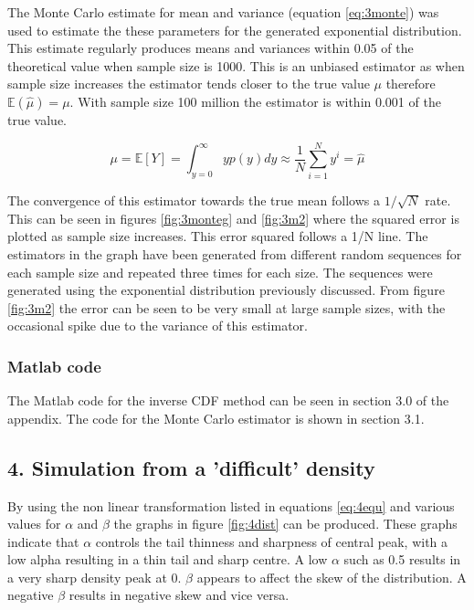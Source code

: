 \documentclass[twoside,twocolumn]{article}
\begin{document}
The Monte Carlo estimate for mean and variance (equation \ref{eq:3monte}) was used to estimate the these parameters for the generated exponential distribution. This estimate regularly produces means and variances within 0.05 of the theoretical value when sample size is 1000. This is an unbiased estimator as when sample size increases the estimator tends closer to the true value $\mu$ therefore $\mathbb{E}(\hat{\mu})=\mu$. With sample size 100 million the estimator is within 0.001 of the true value.

\begin{equation}
\label{eq:3monte}
\mu = \mathbb{E}[Y]=\int^{\infty}_{y=0}yp(y)dy \approx \frac{1}{N}\sum\limits^N_{i=1}y^i = \hat{\mu}
\end{equation} 

The convergence of this estimator towards the true mean follows a $1/\sqrt{N}$ rate. This can be seen in figures \ref{fig:3monteg} and \ref{fig:3m2} where the squared error is plotted as sample size increases. This error squared follows a 1/N line. The estimators in the graph have been generated from different random sequences for each sample size and repeated three times for each size. The sequences were generated using the exponential distribution previously discussed. From figure \ref{fig:3m2} the error can be seen to be very small at large sample sizes, with the occasional spike due to the variance of this estimator.

\subsubsection{Matlab code} %
The Matlab code for the inverse CDF method can be seen in section 3.0 of the appendix. The code for the Monte Carlo estimator is shown in section 3.1.

\subsection{4. Simulation from a 'difficult' density}




By using the non linear transformation listed in equations \ref{eq:4equ} and various values for $\alpha$ and $\beta$ the graphs in figure \ref{fig:4dist} can be produced. These graphs indicate that $\alpha$ controls the tail thinness and sharpness of central peak, with a low alpha resulting in a thin tail and sharp centre. A low $\alpha$ such as 0.5 results in a very sharp density peak at 0. $\beta$ appears to affect the skew of the distribution. A negative $\beta$ results in negative skew and vice versa. 
\end{document}
